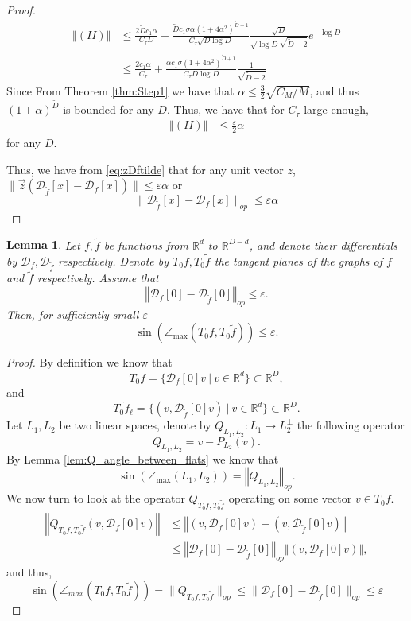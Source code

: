 \documentclass[12pt]{article}
\newtheorem{Lemma}[Theorem]{Lemma}
\theoremstyle{remark}
\newcommand{\RR}{\mathbb{R}}
\newcommand{\DD}{\mathcal{D}}
\newcommand{\eps}{\varepsilon}
\newcommand{\norm}[1]{\left\Vert #1 \right\Vert}
\newcommand{\wtilde}[1]{\widetilde{#1}}
\newcommand{\lrbrackets}[1]{\left( #1 \right)}
\newcommand{\maxangle}{\angle_{\max}}
\begin{document}
\begin{appendices}
\begin{proof}
\begin{align*}
\norm{(II)} &\leq  \frac{2\wtilde Dc_1 \alpha}{C_\tau D} + \frac{\wtilde Dc_1 \sigma\alpha ( 1 + 4\alpha^2)^{\wtilde D+1}}
{C_\tau \sqrt{D\log D}} \frac{\sqrt{D}}{\sqrt{\log D} \sqrt{\wtilde D-2}}e^{-\log D}
\\
&\leq \frac{2c_1 \alpha}{C_\tau } + \frac{\alpha c_1 \sigma ( 1 + 4\alpha^2)^{\wtilde D+1}}
{C_\tau D\log D} \frac{1}{\sqrt{\wtilde D-2}}
\end{align*}
Since From Theorem \ref{thm:Step1} we have that $\alpha \leq \frac{3}{2} \sqrt{ C_M/M}$, and thus 
$( 1 + \alpha)^{\wtilde D}$ is bounded for any $D$. Thus, we have that for $C_\tau$ large enough, 
\begin{align}
\norm{(II)}&\leq \frac{\eps}{2}\alpha
\end{align}
for any $D$.

Thus, we have from \eqref{eq:zDftilde} that for any unit vector $z$, $\|\vec{z}( \DD_{\wtilde{f}}[x] - \DD_f[x])\| \leq \eps\alpha$
or 
\[
\| \DD_{\wtilde{f}}[x] - \DD_{f}[x]\|_{op} \leq \eps\alpha
\]
\end{proof}


\begin{Lemma}\label{lem:Diff_Tf_bound}
	Let $ f, \tilde f $ be functions from $ \RR^d $ to $ \RR^{D-d} $, and denote their differentials by $ \DD_f, \DD_{\wtilde f} $ respectively.
	Denote by $ T_0 f, T_0 \wtilde f $ the tangent planes of the graphs of $ f $ and $ \wtilde f $ respectively.
	Assume that
	\[
	\norm{\DD_f[0] - \DD_{\tilde f}[0]}_{op}\leq \varepsilon 
	.\]
	Then, for sufficiently small $ \varepsilon $
	\[
	\sin(\maxangle(T_0 f, T_0 \wtilde{f})) \leq  \varepsilon 
	.\]
\end{Lemma}

\begin{proof}
	By definition we know that
	\[
	T_0 f = \{ \DD_{f}[0]v ~|~ v\in \RR^d \} \subset \RR^D
	,\]
	and
	\[
	T_0 \wtilde f_\ell = \{ (v, \DD_{\wtilde f}[0]v) ~|~ v\in \RR^d \} \subset \RR^D
	.\] 
	Let $ L_1, L_2 $ be two linear spaces, denote by $ Q_{L_1, L_2} :L_1\to L_2^\perp $  the following operator
	\[
	Q_{L_1, L_2} = {v - P_{L_2}(v)}
	.\]
	By Lemma \ref{lem:Q_angle_between_flats} we know that 
	\[
	\sin(\maxangle\lrbrackets{L_1, L_2}) = \norm{Q_{L_1, L_2}}_{op}
	.\]
	We now turn to look at the operator $ Q_{T_0 f, T_0 \wtilde f } $ operating on some vector $ v\in T_0 f $.
	\begin{align*}
	\norm{Q_{T_0 f, T_0 \wtilde f}(v,\DD_{f}[0]v )} 
	&\leq 
	\norm{(v,\DD_{f}[0]v ) - (v,\DD_{\wtilde f}[0]v )}\\
	&\leq 
	\norm{\DD_{f}[0] - \DD_{\wtilde f}[0]}_{op}\norm{(v,\DD_{f}[0]v)}
	,\end{align*}
	and thus,
	\[
	\sin (\angle_{max}(T_0 f, T_0 \wtilde f ))  = \|Q_{T_0 f, T_0 \wtilde f}\|_{op} \leq \|\DD_{f}[0] - \DD_{\wtilde f}[0]\|_{op} \leq  \varepsilon  
	\]
\end{proof}


\end{appendices}
\end{document}

